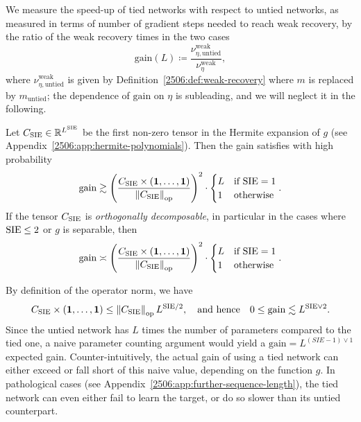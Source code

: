 We measure the speed-up of tied networks with respect to untied networks, as measured in terms of number of gradient steps needed to reach weak recovery, by the ratio of the weak recovery times in the two cases
\begin{equation}
    \mathrm{gain}(L)  \coloneqq \frac{\nu^\mathrm{weak}_{\eta,\mathrm{untied}}}{\nu^\mathrm{weak}_\eta},
\end{equation}
where \(\nu^\mathrm{weak}_{\eta,\mathrm{untied}}\) is given by Definition~\ref{2506:def:weak-recovery} where \(m\) is replaced by \(m_\mathrm{untied}\); the dependence of \(\mathrm{gain}\) on \(\eta\) is subleading, and we will neglect it in the following. 

\begin{theorem} \label{2506:thm:sequencelength-gain}
    Let $C_{\mathrm{SIE}} \in \mathbb{R}^{L^{\mathrm{SIE}}}$ be the first non-zero tensor in the Hermite expansion of $g$ (see Appendix~\ref{2506:app:hermite-polynomials}). Then the gain satisfies with high probability
    \[ \mathrm{gain} \gtrsim \left(\frac{C_{\mathrm{SIE}} \times (\mathbf{1}, \dots, \mathbf{1})}{\left\lVert C_{\mathrm{SIE}}\right\rVert_{\mathrm{op}}}\right)^2 \cdot \begin{cases}
        L & \text{if } \mathrm{SIE} = 1 \\
        1 & \text{otherwise}
    \end{cases}. \]
    If the tensor $C_{\mathrm{SIE}}$ is \emph{orthogonally decomposable}, in particular in the cases where $\mathrm{SIE} \leq 2$ or $g$ is separable, then
    \[ \mathrm{gain} \asymp \left(\frac{C_{\mathrm{SIE}} \times (\mathbf{1}, \dots, \mathbf{1})}{\left\lVert C_{\mathrm{SIE}}\right\rVert_{\mathrm{op}}}\right)^2\cdot \begin{cases}
        L & \text{if } \mathrm{SIE} = 1 \\
        1 & \text{otherwise}
    \end{cases}. \]
\end{theorem}
By definition of the operator norm, we have 
\[ C_{\mathrm{SIE}} \times (\mathbf{1}, \dots, \mathbf{1}) \leq \left\lVert C_{\mathrm{SIE}}\right\rVert_{\mathrm{op}} L^{\mathrm{SIE}/2},
\quad\text{and hence}\quad
0 \leq \mathrm{gain} \lesssim L^{\mathrm{SIE} \vee 2}.\]
Since the untied network has \(L\) times the number of parameters compared to the tied one, a naive parameter counting argument would yield a \(\mathrm{gain}=L^{(SIE-1) \vee 1}\) expected gain. Counter-intuitively, the actual gain of using a tied network can either exceed or fall short of this naive value, depending on the function $g$. In pathological cases (see Appendix~\ref{2506:app:further-sequence-length}), the tied network can even either fail to learn the target, or do so slower than its untied counterpart.

